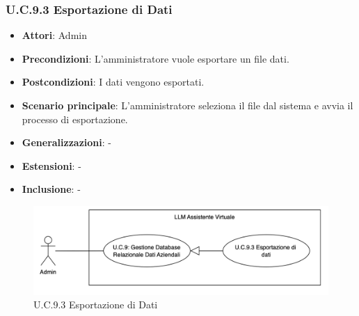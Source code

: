 \subsubsection{U.C.9.3 Esportazione di Dati}
\begin{itemize}
    \item \textbf{Attori}: Admin
    \item \textbf{Precondizioni}: L’amministratore vuole esportare un file dati.
    \item \textbf{Postcondizioni}: I dati vengono esportati.
    \item \textbf{Scenario principale}: L'amministratore seleziona il file dal sistema e avvia il processo di esportazione.
    \item \textbf{Generalizzazioni}: -
    \item \textbf{Estensioni}: -
    \item \textbf{Inclusione}: -
\end{itemize}
\begin{figure}[H]
    \centering
    \includegraphics[width=\textwidth]{img/U.C.9.3.png}
    \caption{U.C.9.3 Esportazione di Dati}
\end{figure}
\newpage

